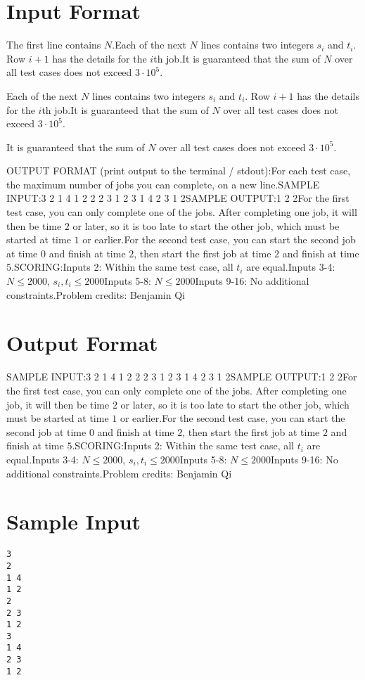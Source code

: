 \documentclass[12pt]{article}
\begin{document}
\section*{Input Format}
The first line contains $N$.Each of the next $N$ lines contains two integers $s_i$ and $t_i$. Row $i+1$ has
the details for the $i$th job.It is guaranteed that the sum of $N$ over all test cases does not exceed
$3\cdot 10^5$.

Each of the next $N$ lines contains two integers $s_i$ and $t_i$. Row $i+1$ has
the details for the $i$th job.It is guaranteed that the sum of $N$ over all test cases does not exceed
$3\cdot 10^5$.

It is guaranteed that the sum of $N$ over all test cases does not exceed
$3\cdot 10^5$.

OUTPUT FORMAT (print output to the terminal / stdout):For each test case, the maximum number of jobs you can complete, on a new line.SAMPLE INPUT:3
2
1 4
1 2
2
2 3
1 2
3
1 4
2 3
1 2SAMPLE OUTPUT:1
2
2For the first test case, you can only complete one of the jobs. After completing
one job, it will then be time $2$ or later, so it is too late to start the other
job, which must be started at time $1$ or earlier.For the second test case,  you can start the second job at time $0$ and finish
at time $2$,  then start the first job at time $2$ and finish at time $5$.SCORING:Inputs 2: Within the same test case, all $t_i$ are equal.Inputs 3-4: $N\le 2000$, $s_i, t_i\le 2000$Inputs 5-8: $N\le 2000$Inputs 9-16: No additional constraints.Problem credits: Benjamin Qi

\section*{Output Format}
SAMPLE INPUT:3
2
1 4
1 2
2
2 3
1 2
3
1 4
2 3
1 2SAMPLE OUTPUT:1
2
2For the first test case, you can only complete one of the jobs. After completing
one job, it will then be time $2$ or later, so it is too late to start the other
job, which must be started at time $1$ or earlier.For the second test case,  you can start the second job at time $0$ and finish
at time $2$,  then start the first job at time $2$ and finish at time $5$.SCORING:Inputs 2: Within the same test case, all $t_i$ are equal.Inputs 3-4: $N\le 2000$, $s_i, t_i\le 2000$Inputs 5-8: $N\le 2000$Inputs 9-16: No additional constraints.Problem credits: Benjamin Qi

\section*{Sample Input}
\begin{verbatim}
3
2
1 4
1 2
2
2 3
1 2
3
1 4
2 3
1 2
\end{verbatim}
\end{document}
